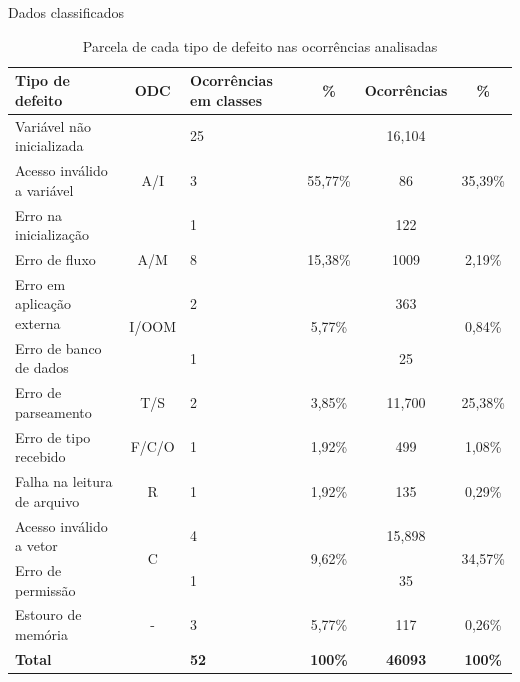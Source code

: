 \documentclass[brazilian]{beamer}
\begin{document}
\begin{frame}{Dados classificados}
    \begin{table}[H]
        \centering
        \begin{tabularx}{\linewidth}{ X|c|X|c|c|c }
            \textbf{Tipo de defeito} & \textbf{ODC} & \textbf{Ocorrências em classes} & \textbf{\%} & \textbf{Ocorrências} & \textbf{\%} \\
            \hline
            Variável não inicializada & \multirow{3}{*}{ A/I } & 25 & \multirow{3}{*}{ 55,77\% } & 16,104 & 
            \multirow{3}{*}{ 35,39\% } \\
            Acesso inválido a variável & & 3 & & 86 & \\
            Erro na inicialização & & 1 & & 122 & \\
            \hline
            Erro de fluxo & A/M & 8 & 15,38\% & 1009 & 2,19\% \\
            \hline
            Erro em aplicação externa & \multirow{2}{*}{I/OOM} & 2 & \multirow{2}{*}{5,77\%} & 363 & \multirow{2}{*}{0,84\%} \\
            Erro de banco de dados & & 1 & & 25 \\
            \hline
            Erro de parseamento & T/S & 2 & 3,85\% & 11,700 & 25,38\% \\
            \hline
            Erro de tipo recebido & F/C/O & 1 & 1,92\% & 499 & 1,08\% \\
            \hline
            Falha na leitura de arquivo & R & 1 & 1,92\% & 135 & 0,29\% \\
            \hline
            Acesso inválido a vetor & \multirow{2}{*}{C} & 4 & \multirow{2}{*}{9,62\%} & 15,898 & \multirow{2}{*}{34,57\%} \\
            Erro de permissão & & 1 & & 35 & \\
            \hline
            Estouro de memória & - & 3 & 5,77\% & 117 & 0,26\% \\
            \hline
            \multicolumn{2}{l|}{\textbf{Total}} & \textbf{52} & \textbf{100\%} & \textbf{46093} & \textbf{100\%} \\
        \end{tabularx}
        \caption{Parcela de cada tipo de defeito nas ocorrências analisadas}
        \label{table:our_results_classified_by_odc}
    \end{table}
\end{frame}
\end{document}
